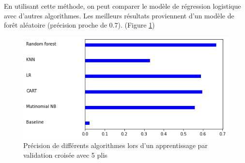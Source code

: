 En utilisant cette méthode, on peut comparer le modèle de régression logistique avec d'autres algorithmes. Les meilleurs résultats proviennent d'un modèle de forêt aléatoire (précision proche de 0.7). (Figure \ref{comparaison})

\begin{figure}
    \center
    \includegraphics[scale=.5]{img/comparaison.png}
    \caption{Précision de différents algorithmes lors d'un apprentissage par validation croisée avec 5 plis}
    \label{comparaison}
\end{figure}